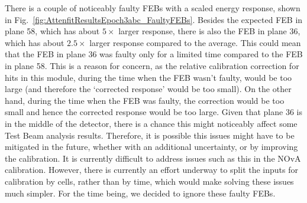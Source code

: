 There is a couple of noticeably faulty \glspl{FEB} with a scaled energy response, shown in Fig.~\ref{fig:AttenfitResultsEpoch3abc_FaultyFEBs}. Besides the expected \gls{FEB} in plane 58, which has about $5\times$ larger response, there is also the \gls{FEB} in plane 36, which has about $2.5\times$ larger response compared to the average. This could mean that the \gls{FEB} in plane 36 was faulty only for a limited time compared to the \gls{FEB} in plane 58. This is a reason for concern, as the relative calibration correction for hits in this module, during the time when the \gls{FEB} wasn't faulty, would be too large (and therefore the `corrected response' would be too small). On the other hand, during the time when the \gls{FEB} was faulty, the correction would be too small and hence the corrected response would be too large. Given that plane 36 is in the middle of the detector, there is a chance this might noticeably affect some Test Beam analysis results. Therefore, it is possible this issues might have to be mitigated in the future, whether with an additional uncertainty, or by improving the calibration. It is currently difficult to address issues such as this in the \gls{NOvA} calibration. However, there is currently an effort underway to split the inputs for calibration by cells, rather than by time, which would make solving these issues much simpler. For the time being, we decided to ignore these faulty \glspl{FEB}.

